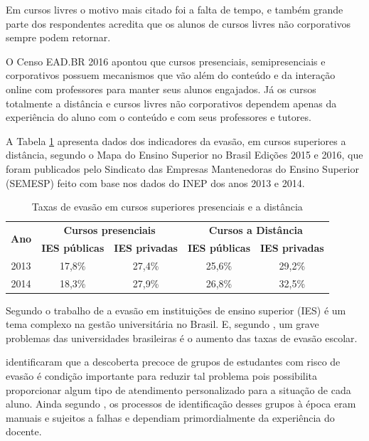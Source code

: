 Em cursos livres o motivo mais citado foi a falta de tempo, e também grande
parte dos respondentes acredita que os alunos de cursos livres não corporativos
sempre podem retornar.

O Censo EAD.BR 2016 apontou que cursos presenciais, semipresenciais e
corporativos possuem mecanismos que vão além do conteúdo e da interação online
com professores para manter seus alunos engajados. Já os cursos totalmente a
distância e cursos livres não corporativos dependem apenas da experiência do
aluno com o conteúdo e com seus professores e tutores.

A Tabela \ref{tableEvasionTax2} apresenta dados dos indicadores da evasão, em
cursos superiores a distância, segundo o Mapa do Ensino Superior no Brasil
Edições 2015 e 2016, que foram publicados pelo Sindicato das Empresas
Mantenedoras do Ensino Superior (SEMESP) feito com base nos dados do INEP dos
anos 2013 e 2014.

\begin{table}[!htb]
  \centering
  \caption{\label{tableEvasionTax2} Taxas de evasão em cursos superiores presenciais e a distância}
  \begin{tabular}{@{}ccccc@{}}
    \toprule
    \multirow{2}{*}{\textbf{Ano}} & \multicolumn{2}{c}{\textbf{Cursos presenciais}} & \multicolumn{2}{c}{\textbf{Cursos a Distância}} \\ \cmidrule(l){2-5}
    & \textbf{IES públicas} & \textbf{IES privadas} & \textbf{IES públicas} & \textbf{IES privadas} \\ \midrule
    2013 & 17,8\% & 27,4\% & 25,6\% & 29,2\% \\
    2014 & 18,3\% & 27,9\% & 26,8\% & 32,5\% \\ \bottomrule
  \end{tabular}
\end{table}

Segundo o trabalho de  a
evasão em instituições de ensino superior (IES) é um tema complexo na gestão
universitária no Brasil. E, segundo
, um grave problemas das
universidades brasileiras é o aumento das taxas de evasão escolar.

 identificaram que a descoberta precoce de
grupos de estudantes com risco de evasão é condição importante para reduzir tal
problema pois possibilita proporcionar algum tipo de atendimento personalizado
para a situação de cada aluno. Ainda segundo
, os processos de identificação desses
grupos à época eram manuais e sujeitos a falhas e dependiam primordialmente da
experiência do docente.

